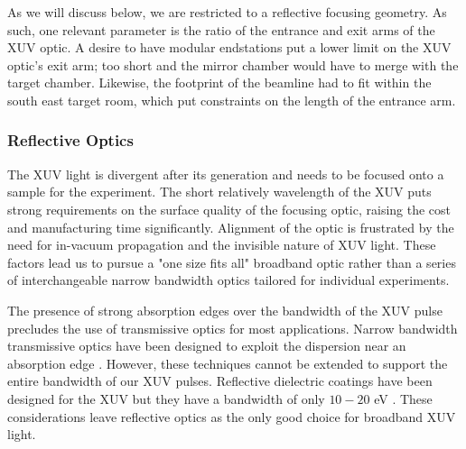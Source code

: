 As we will discuss below, we are restricted to a reflective focusing geometry. As such, one relevant parameter is the ratio of the entrance and exit arms of the XUV optic. A desire to have modular endstations put a lower limit on the XUV optic's exit arm; too short and the mirror chamber would have to merge with the target chamber. Likewise, the footprint of the beamline had to fit within the south east target room, which put constraints on the length of the entrance arm.



\subsubsection{Reflective Optics}

The XUV light is divergent after its generation and needs to be focused onto a sample for the experiment. The short relatively wavelength of the XUV puts strong requirements on the surface quality of the focusing optic, raising the cost and manufacturing time significantly. Alignment of the optic is frustrated by the need for in-vacuum propagation and the invisible nature of XUV light. These factors lead us to pursue a "one size fits all" broadband optic rather than a series of interchangeable narrow bandwidth optics tailored for individual experiments.

The presence of strong absorption edges over the bandwidth of the XUV pulse precludes the use of transmissive optics for most applications. Narrow bandwidth transmissive optics have been designed to exploit the dispersion near an absorption edge \cite{drescherExtremeultravioletRefractiveOptics2018}. However, these techniques cannot be extended to support the entire bandwidth of our XUV pulses. Reflective dielectric coatings have been designed for the XUV but they have a bandwidth of only $10-20$ eV \cite{kiesewetterDynamicsNearThresholdAttosecond2019}. These considerations leave reflective optics as the only good choice for broadband XUV light.


